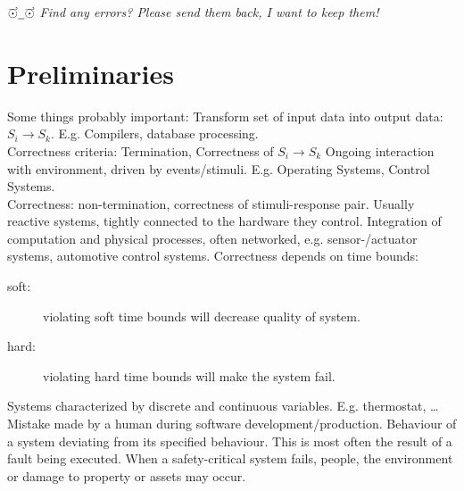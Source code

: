 \documentclass[a4paper, 10pt]{article}
\begin{document}


\textit{\ensuremath{\overset{-\mkern-11mu-\mkern-3.5mu\rhook}{\smash{\odot}\rule{0ex}{.46ex}}\underline{\hspace{0.5em}}\overset{-\mkern-11mu-\mkern-3.5mu\rhook}{\smash{\odot}\rule{0ex}{.46ex}}}
Find any errors? Please send them back, I want to keep them!}

\section{Preliminaries}

\begin{definition}
Some things probably important:
Transform set of input data into output data: $S_i\to S_k$. E.g. Compilers, database processing. \\
Correctness criteria: Termination, Correctness of $S_i\to S_k$
Ongoing interaction with environment, driven by events/stimuli. E.g. Operating Systems, Control Systems.\\
Correctness: non-termination, correctness of stimuli-response pair.
Usually reactive systems, tightly connected to the hardware they control.
Integration of computation and physical processes, often networked, e.g. sensor-/actuator systems, automotive control systems.
Correctness depends on time bounds:
\begin{description}
    \item[soft:] violating soft time bounds will decrease quality of system.
    \item[hard:] violating hard time bounds will make the system fail.
\end{description}
Systems characterized by discrete and continuous variables. E.g. thermostat, \dots
{}
Mistake made by a human during software development/production.
Behaviour of a system deviating from its specified behaviour. This is most often the result of a fault being executed.
When a safety-critical system fails, people, the environment or damage to property or assets may occur.
\end{definition}
\end{document}

